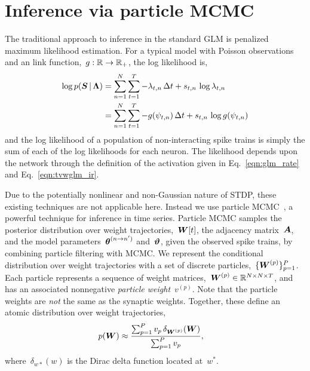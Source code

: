 \section{Inference via particle MCMC}
The traditional approach to inference in the standard GLM is penalized
maximum likelihood estimation. For a typical model with Poisson observations 
and an link function,~${g: \mathbb{R} \to \mathbb{R}_+}$, the 
log likelihood is,
\begin{align}
\label{eqn:glm_lkhd}
\log p(\boldsymbol{S} \,|\, \boldsymbol{\Lambda}) 
  &= 
    \sum_{n=1}^N \sum_{t=1}^T  -\lambda_{t,n} \, \Delta t
    + s_{t,n} \, \log \lambda_{t,n}  \\
  &= \sum_{n=1}^N \sum_{t=1}^T  -g(\psi_{t,n}) \, \Delta t
    + s_{t,n} \, \log g(\psi_{t,n}) 
\end{align}
and the log likelihood of a population of non-interacting spike trains
is simply the sum of each of the log likelihoods for each neuron. The
likelihood depends upon the network 
through the definition of the activation given
in Eq.~\ref{eqn:glm_rate} and Eq.~\ref{eqn:tvwglm_ir}. 

Due to the potentially nonlinear and non-Gaussian nature of STDP,
these existing techniques are not applicable here. Instead we use
particle MCMC~\cite{Andrieu-2010}, a powerful technique for inference
in time series. Particle MCMC samples the posterior distribution over
weight trajectories,~$\boldsymbol{W}[t]$, the adjacency matrix~$\boldsymbol{A}$, and the
model parameters~$\boldsymbol{\theta}^{(n \to n')}$ and~$\boldsymbol{\vartheta}$, given the
observed spike trains, by combining particle filtering with MCMC.  We
represent the conditional distribution over weight trajectories with a
set of discrete particles,~${\{\boldsymbol{W}^{(p)}\}_{p=1}^P}$. Each particle
represents a sequence of weight
matrices,~$\boldsymbol{W}^{(p)} \in \mathbb{R}^{N \times N \times T}$, and has an
associated nonnegative \emph{particle weight}~$v^{(p)}$. Note that the particle
weights are \emph{not} the same as the synaptic weights. Together,
these define an atomic distribution over weight trajectories,
\begin{align}
p(\boldsymbol{W}) &\approx \frac{\sum_{p=1}^P v_p \, \delta_{\boldsymbol{W}^{(p)}} (\boldsymbol{W})}
         {\sum_{p=1}^P v_p},
\end{align}
where~$\delta_{w*}(w)$ is the Dirac delta function located at~$w^*$.

